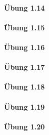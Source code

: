 \paragraph{Übung 1.14}

\paragraph{Übung 1.15}

\paragraph{Übung 1.16}

\paragraph{Übung 1.17}

\paragraph{Übung 1.18}

\paragraph{Übung 1.19}

\paragraph{Übung 1.20}